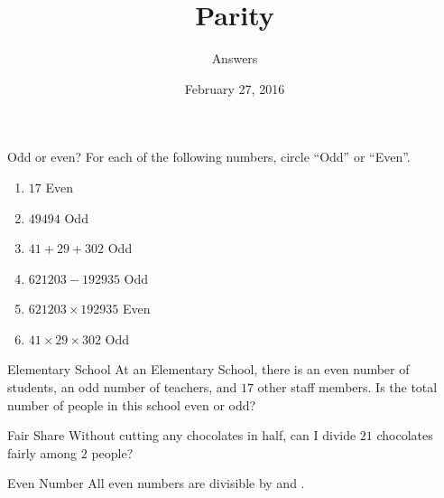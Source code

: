 \documentclass[12pt,letterpaper]{article}
\title{Parity}
\author{Answers}
\date{February 27, 2016}
\begin{document}
\maketitle

\thispagestyle{empty}

\begin{problem}{Odd or even?}
For each of the following numbers, circle ``Odd'' or ``Even''.
\begin{enumerate}
 \item $17$ \hfill {} \hspace{1em} Even
 \item $49494$ \hfill Odd \hspace{1em} 
 \item $41 + 29 + 302$ \hfill Odd \hspace{1em} 
 \item $621203 - 192935$ \hfill Odd \hspace{1em} 
 \item $621203 \times 192935$ \hfill {} \hspace{1em} Even
 \item $41 \times 29 \times 302$ \hfill Odd \hspace{1em} 
\end{enumerate}
\end{problem}

\begin{problem}{Elementary School}
 At an Elementary School, there is an even number of students, an odd number of
 teachers, and $17$ other staff members. Is the total number of people in this
 school even or odd? 
\end{problem}

\begin{problem}{Fair Share}
 Without cutting any chocolates in half, can I divide $21$ chocolates fairly
 among $2$ people? 
\end{problem}

\begin{problem}{Even Number}
 All even numbers are divisible by  and .
\end{problem}
\end{document}
